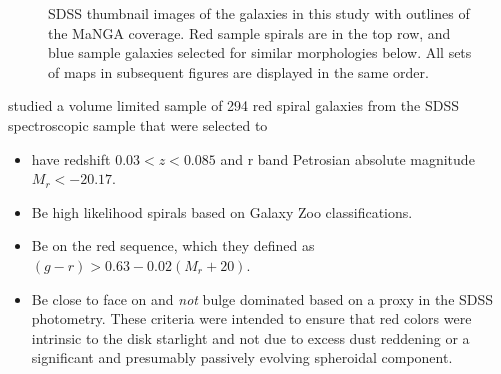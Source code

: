 \documentclass[modern]{aastex62}
\begin{document}
\begin{figure}[ht]
\hfill
{}
\caption{SDSS thumbnail images of the galaxies in this study with outlines of the MaNGA coverage. Red sample spirals are in the top row, and blue sample galaxies selected for similar morphologies below. All sets of maps in subsequent figures are displayed in the same order.}
\label{fig:thumbnails}
\end{figure}

 studied a volume limited sample of 294 red spiral galaxies from the SDSS spectroscopic sample that were selected to

\begin{itemize}
\item
have redshift $0.03 < z < 0.085$ and r band Petrosian absolute magnitude $M_r < -20.17$.
\item
Be high likelihood spirals based on Galaxy Zoo \citep{2008MNRAS.389.1179L} classifications.
\item
Be on the red sequence, which they defined as $(g - r) > 0.63 - 0.02(M_r + 20)$.
\item
Be close to face on and \emph{not} bulge dominated based on a proxy in the SDSS photometry. These criteria were intended to ensure that red colors were intrinsic to the disk starlight and not due to excess dust reddening or a significant and presumably passively evolving spheroidal component.
\end{itemize}
\end{document}
